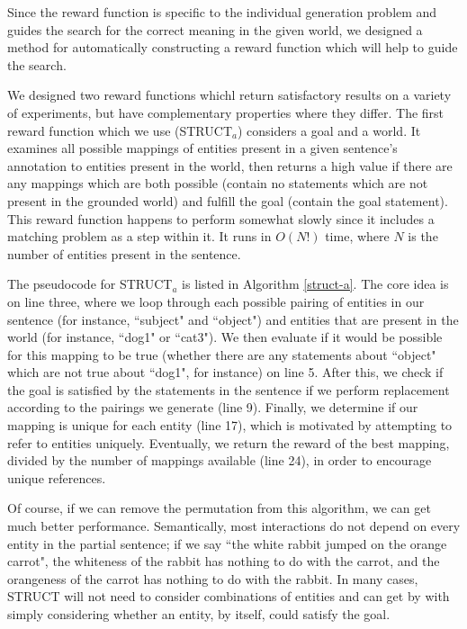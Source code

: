 Since the reward function is specific to the individual generation
problem and guides the search for the correct meaning in the
given world, we designed a method for automatically constructing
a reward function which will help to guide the search.
 
We designed two reward functions whichl
 return satisfactory results on a variety of experiments, but have complementary
properties where they differ.  The first reward function
 which we use (STRUCT$_a$) considers a goal and a
 world.  It examines all possible mappings of entities present in
 a given sentence's annotation to entities present in the world, then returns
 a high value if there are any mappings which are both possible (contain no statements
 which are not present in the grounded world) and fulfill the goal (contain the
 goal statement).  This reward function happens to perform somewhat slowly since it includes
a matching problem as a step within it.  It runs in $O(N!)$ time, where
$N$ is the number of entities present in the sentence.  

The pseudocode for STRUCT$_a$ is listed in Algorithm \ref{struct-a}.  The core idea is on line three, where
we loop through each possible pairing of entities in our sentence (for instance,
``subject" and ``object") and entities that are present in the world (for instance,
``dog1" or ``cat3").  We then evaluate if it would be possible for this mapping to be
true (whether there are any statements about ``object" which are not true about
``dog1", for instance) on line 5.  After this, we check if the goal is satisfied by
the statements in the sentence if we perform replacement according to the pairings
we generate (line 9).  Finally, we determine if our mapping is unique for each entity
(line 17), which is motivated by attempting to refer to entities uniquely.  Eventually,
we return the reward of the best mapping, divided by the number of mappings
available (line 24), in order to encourage unique references.

Of course, if we can remove the permutation from this algorithm,
we can get much better performance.  Semantically, most interactions do not
depend on every entity in the partial sentence; if we say ``the white rabbit
jumped on the orange carrot", the whiteness of the rabbit has nothing to do
with the carrot, and the orangeness of the carrot has nothing to do with the rabbit.  
In many cases,
STRUCT will not need to consider combinations of entities and
can get by with simply considering whether an entity, by itself, could
satisfy the goal.

